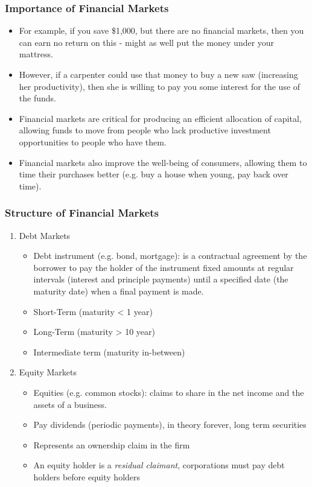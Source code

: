 \documentclass{beamer}
\begin{document}
\begin{frame}
\frametitle{Importance of Financial Markets}
\begin{itemize}
\item For example, if you save \$1,000, but there are no financial markets, then you can earn no return on this - might as well put the money under your mattress.
\vspace{\baselineskip}
\item However, if a carpenter could use that money to buy a new saw (increasing her productivity), then she is willing to pay you some interest for the use of the funds.
\vspace{\baselineskip}
\item Financial markets are critical for producing an efficient allocation of capital, allowing funds to move from people who lack productive investment opportunities to people who have them.
\vspace{\baselineskip}
\item Financial markets also improve the well-being of consumers, allowing them to time their purchases better (e.g. buy a house when young, pay back over time).
\end{itemize}
\end{frame}


\begin{frame}
\frametitle{Structure of Financial Markets }

\begin{enumerate}
\item Debt Markets
\smallskip
\begin{itemize}
\item Debt instrument (e.g. bond, mortgage): is a contractual agreement by the borrower to pay the holder of the instrument fixed amounts at regular intervals (interest and principle payments) until a specified date (the maturity date) when a final payment is made.
\item Short-Term (maturity <  1 year)
\item Long-Term (maturity > 10 year)
\item Intermediate term (maturity in-between)
\end{itemize}
\vspace{\baselineskip}

\item Equity Markets
\smallskip
\begin{itemize}
\item Equities (e.g. common stocks): claims to share in the net income and the assets of a business. 
\item Pay dividends (periodic payments), in theory forever, long term securities
\item Represents an ownership claim in the firm
\item An equity holder is a \textit{residual claimant}, corporations must pay debt holders before equity holders
\end{itemize}
\end{enumerate}
\end{frame}
\end{document}
